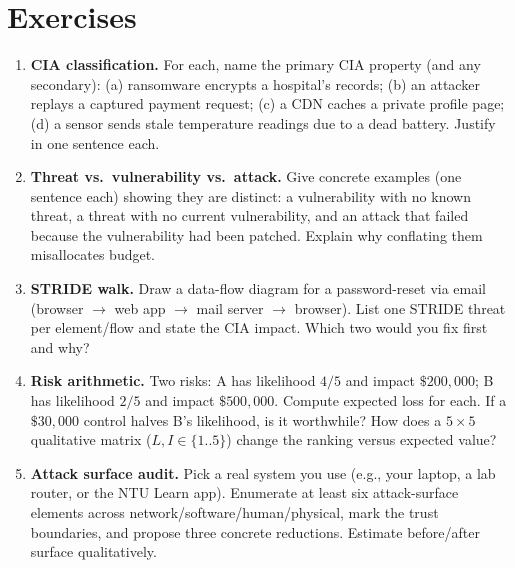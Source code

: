 \section{Exercises}
\label{sec:ch01-exercises}
\begin{enumerate}[label=E1.\arabic*, leftmargin=*, itemsep=0.8em]
    \item \textbf{CIA classification.} For each, name the primary CIA property (and any secondary): (a) ransomware encrypts a hospital's records; (b) an attacker replays a captured payment request; (c) a CDN caches a private profile page; (d) a sensor sends stale temperature readings due to a dead battery. Justify in one sentence each.
    \item \textbf{Threat vs.\ vulnerability vs.\ attack.} Give concrete examples (one sentence each) showing they are distinct: a vulnerability with no known threat, a threat with no current vulnerability, and an attack that failed because the vulnerability had been patched. Explain why conflating them misallocates budget.
    \item \textbf{STRIDE walk.} Draw a data-flow diagram for a password-reset via email (browser $\to$ web app $\to$ mail server $\to$ browser). List one STRIDE threat per element/flow and state the CIA impact. Which two would you fix first and why?
    \item \textbf{Risk arithmetic.} Two risks: A has likelihood $4/5$ and impact $\$200{,}000$; B has likelihood $2/5$ and impact $\$500{,}000$. Compute expected loss for each. If a $\$30{,}000$ control halves B's likelihood, is it worthwhile? How does a $5\times5$ qualitative matrix ($L,I\in\{1..5\}$) change the ranking versus expected value?
    \item \textbf{Attack surface audit.} Pick a real system you use (e.g., your laptop, a lab router, or the NTU Learn app). Enumerate at least six attack-surface elements across network/software/human/physical, mark the trust boundaries, and propose three concrete reductions. Estimate before/after surface qualitatively.
\end{enumerate}
